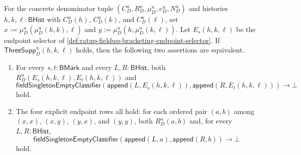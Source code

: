 \begin{theorem}
\label{thm:ratup-fieldup-selector-complete-four-pair-coverage}
For the concrete denominator tuple $(C_D^u,R_D^u,\mu_D^u,e_D^u,N_D^u)$ and
histories $h,k,\ell:\mathsf{BHist}$ with $C_D^u(h)$, $C_D^u(k)$, and
$C_D^u(\ell)$, set $x:=\mu_D^u(\mu_D^u(h,k),\ell)$ and
$y:=\mu_D^u(h,\mu_D^u(k,\ell))$. Let $E_s(h,k,\ell)$ be the endpoint selector
of \autoref{def:ratup-fieldup-bracketing-endpoint-selector}. If
$\mathsf{ThreeSupp}_D^u(h,k,\ell)$ holds, then the following two assertions are
equivalent.
\begin{enumerate}
  \item For every $s,t:\mathsf{BMark}$ and every $L,R:\mathsf{BHist}$, both
  $R_D^u(E_s(h,k,\ell),E_t(h,k,\ell))$ and
  $$
  \mathsf{fieldSingletonEmptyClassifier}
  (\mathsf{append}(L,E_s(h,k,\ell)),\mathsf{append}(R,E_t(h,k,\ell)))\to\bot
  $$
  hold.

  \item The four explicit endpoint rows all hold: for each ordered pair
  $(a,b)$ among $(x,x)$, $(x,y)$, $(y,x)$, and $(y,y)$, both
  $R_D^u(a,b)$ and, for every $L,R:\mathsf{BHist}$,
  $$
  \mathsf{fieldSingletonEmptyClassifier}
  (\mathsf{append}(L,a),\mathsf{append}(R,b))\to\bot
  $$
  hold.
\end{enumerate}
\end{theorem}
